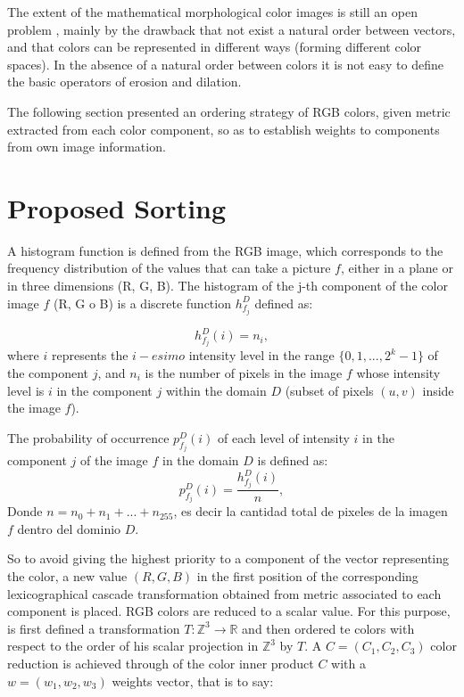 The extent of the mathematical morphological color images is still an open problem \cite{aptoula2007pseudo}, mainly by the drawback that not exist a natural order between vectors, and that colors can be represented in different ways (forming different color spaces). In the absence of a natural order between colors it is not easy to define the basic operators of erosion and dilation.  

The following section presented  an ordering strategy of RGB colors, given metric extracted from each color component, so as to establish weights to components from own image information.



 \section{Proposed Sorting}

A histogram function is defined from the RGB image, which corresponds to the frequency distribution of the values that can take a picture $f$, either in a plane or in three dimensions (R, G, B). The histogram of the j-th component of the color image $f$ (R, G o B) is a discrete function $h_{f_j}^{D}$ defined as:%

\begin{equation}
\label{histograma}
   h_{f_j}^{D}(i) = n_i,
\end{equation} 
where ${i}$ represents the $i-esimo$ intensity level in the range $\{0,1,...,2^k-1\}$ 
of the component $j$, and $n_i$ is the number of pixels in the image $f$ whose intensity level is $i$ in the component $j$ 
within the domain $D$ (subset of pixels $(u,v)$ inside the image $f$).

The probability of occurrence $p_{f_j}^{D}(i)$ of each level of intensity $i$ in the component $j$ of the image $f$ in the domain $D$ is defined as:
\begin{equation}
\label{probabilidad}
   p_{f_j}^{D}(i) = \frac{h_{f_j}^{D}(i)}{n},
\end{equation} Donde $n = n_0 + n_1 + ... + n_{255}$, es decir la cantidad total de pixeles de la imagen $f$ dentro del dominio $D$. 

So to avoid giving the highest priority to a component of the vector representing the color, a new value $(R,G,B)$ in the first position of the corresponding lexicographical cascade transformation obtained from metric associated to each component is placed.
RGB colors are reduced to a scalar value. For this purpose, is first defined a transformation $T:\mathbb{Z}^3 \rightarrow \mathbb{R}$ and then ordered te colors with respect to the order of his scalar projection in $\mathbb{Z}^3$ by $T$.
A $
C=(C_1,C_2,C_3)$ color reduction is achieved through of the color inner product $C$ with a $w=(w_1,w_2,w_3) $ weights vector, that is to say:

